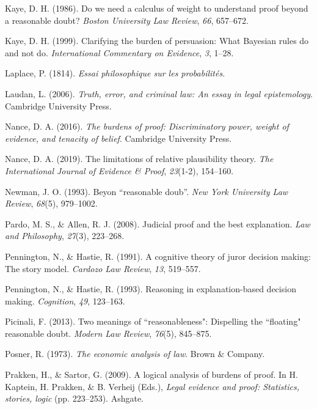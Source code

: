 \documentclass[10pt,dvipsnames]{scrartcl}
\begin{document}
\hypertarget{ref-Kaye1986Do}{}
Kaye, D. H. (1986). Do we need a calculus of weight to understand proof
beyond a reasonable doubt? \emph{Boston University Law Review},
\emph{66}, 657--672.

\hypertarget{ref-Kaye1999clarifying}{}
Kaye, D. H. (1999). Clarifying the burden of persuasion: What Bayesian
rules do and not do. \emph{International Commentary on Evidence},
\emph{3}, 1--28.

\hypertarget{ref-Laplace1814}{}
Laplace, P. (1814). \emph{Essai philosophique sur les probabilités}.

\hypertarget{ref-laudan2006truth}{}
Laudan, L. (2006). \emph{Truth, error, and criminal law: An essay in
legal epistemology}. Cambridge University Press.

\hypertarget{ref-nance2016}{}
Nance, D. A. (2016). \emph{The burdens of proof: Discriminatory power,
weight of evidence, and tenacity of belief}. Cambridge University Press.

\hypertarget{ref-nance2019LimitationsRelativePlausibility}{}
Nance, D. A. (2019). The limitations of relative plausibility theory.
\emph{The International Journal of Evidence \& Proof}, \emph{23}(1-2),
154--160.

\hypertarget{ref-newman1993}{}
Newman, J. O. (1993). Beyon ``reasonable doub''. \emph{New York
University Law Review}, \emph{68}(5), 979--1002.

\hypertarget{ref-Pardo2008judicial}{}
Pardo, M. S., \& Allen, R. J. (2008). Judicial proof and the best
explanation. \emph{Law and Philosophy}, \emph{27}(3), 223--268.

\hypertarget{ref-Pennington1991}{}
Pennington, N., \& Hastie, R. (1991). A cognitive theory of juror
decision making: The story model. \emph{Cardozo Law Review}, \emph{13},
519--557.

\hypertarget{ref-penn1993}{}
Pennington, N., \& Hastie, R. (1993). Reasoning in explanation-based
decision making. \emph{Cognition}, \emph{49}, 123--163.

\hypertarget{ref-picinali2013}{}
Picinali, F. (2013). Two meanings of ``reasonableness": Dispelling the
``floating" reasonable doubt. \emph{Modern Law Review}, \emph{76}(5),
845--875.

\hypertarget{ref-Posner1973}{}
Posner, R. (1973). \emph{The economic analysis of law}. Brown \&
Company.

\hypertarget{ref-prakken2009}{}
Prakken, H., \& Sartor, G. (2009). A logical analysis of burdens of
proof. In H. Kaptein, H. Prakken, \& B. Verheij (Eds.), \emph{Legal
evidence and proof: Statistics, stories, logic} (pp. 223--253). Ashgate.
\end{document}
